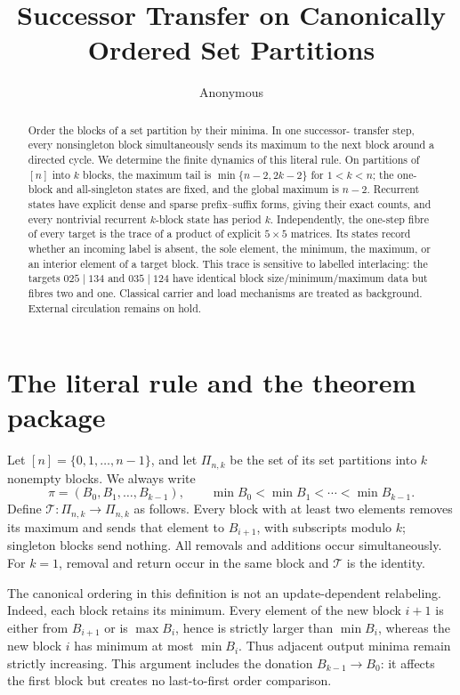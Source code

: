 \documentclass[a4paper,10pt]{amsart}
\title[Successor transfer on set partitions]{Successor Transfer on Canonically Ordered Set Partitions}
\author{Anonymous}
\date{}
\theoremstyle{definition}
\theoremstyle{remark}
\newcommand{\T}{\mathcal T}
\begin{document}
\begin{abstract}
Order the blocks of a set partition by their minima.  In one successor-
transfer step, every nonsingleton block simultaneously sends its maximum to
the next block around a directed cycle.  We determine the finite dynamics of
this literal rule.  On partitions of $[n]$ into $k$ blocks, the maximum tail
is $\min\{n-2,2k-2\}$ for $1<k<n$; the one-block and all-singleton states are
fixed, and the global maximum is $n-2$.  Recurrent states have explicit dense
and sparse prefix--suffix forms, giving their exact counts, and every
nontrivial recurrent $k$-block state has period $k$.  Independently, the
one-step fibre of every target is the trace of a product of explicit
$5\times5$ matrices.  Its states record whether an incoming label is absent,
the sole element, the minimum, the maximum, or an interior element of a
target block.  This trace is sensitive to labelled interlacing: the targets
$025\mid134$ and $035\mid124$ have identical block size/minimum/maximum data
but fibres two and one.  Classical carrier and load mechanisms are treated as
background.  External circulation remains on hold.
\end{abstract}

\maketitle

\section{The literal rule and the theorem package}

Let $[n]=\{0,1,\ldots,n-1\}$, and let $\Pi_{n,k}$ be the set of its set
partitions into $k$ nonempty blocks.  We always write
\[
 \pi=(B_0,B_1,\ldots,B_{k-1}),\qquad
 \min B_0<\min B_1<\cdots<\min B_{k-1}.
\]
Define $\T:\Pi_{n,k}\to\Pi_{n,k}$ as follows.  Every block with at least two
elements removes its maximum and sends that element to $B_{i+1}$, with
subscripts modulo $k$; singleton blocks send nothing.  All removals and
additions occur simultaneously.  For $k=1$, removal and return occur in the
same block and $\T$ is the identity.

The canonical ordering in this definition is not an update-dependent
relabeling.  Indeed, each block retains its minimum.  Every element of the
new block $i+1$ is either from $B_{i+1}$ or is $\max B_i$, hence is strictly
larger than $\min B_i$, whereas the new block $i$ has minimum at most
$\min B_i$.  Thus adjacent output minima remain strictly increasing.  This
argument includes the donation $B_{k-1}\to B_0$: it affects the first block
but creates no last-to-first order comparison.
\end{document}
